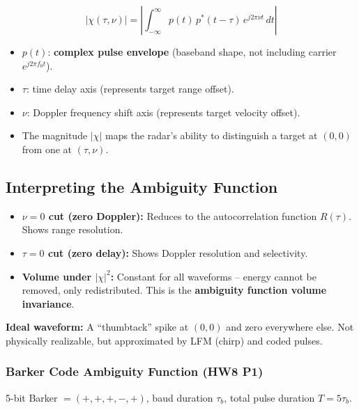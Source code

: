 \documentclass[10pt,letterpaper]{article}
\begin{document}
\begin{tcolorbox}[formulabox, title={Ambiguity Function Definition}]
\begin{equation}
  |\chi(\tau,\nu)| = \left|\int_{-\infty}^{\infty} p(t)\,p^*(t-\tau)\,e^{j2\pi\nu t}\,dt\right|
\end{equation}
\begin{itemize}[noitemsep]
  \item $p(t)$: \textbf{complex pulse envelope} (baseband shape, not including carrier $e^{j2\pi f_0 t}$).
  \item $\tau$: time delay axis (represents target range offset).
  \item $\nu$: Doppler frequency shift axis (represents target velocity offset).
  \item The magnitude $|\chi|$ maps the radar's ability to distinguish a target at $(0,0)$ from one at $(\tau,\nu)$.
\end{itemize}
\end{tcolorbox}

\subsection{Interpreting the Ambiguity Function}

\begin{tcolorbox}[keybox, title={Cuts of the Ambiguity Function}]
\begin{itemize}[noitemsep]
  \item \textbf{$\nu=0$ cut (zero Doppler):} Reduces to the autocorrelation function $R(\tau)$. Shows range resolution.
  \item \textbf{$\tau=0$ cut (zero delay):} Shows Doppler resolution and selectivity.
  \item \textbf{Volume under $|\chi|^2$:} Constant for all waveforms -- energy cannot be removed, only redistributed. This is the \textbf{ambiguity function volume invariance}.
\end{itemize}
\textbf{Ideal waveform:} A ``thumbtack'' spike at $(0,0)$ and zero everywhere else. Not physically realizable, but approximated by LFM (chirp) and coded pulses.
\end{tcolorbox}

\subsubsection{Barker Code Ambiguity Function (HW8 P1)}
5-bit Barker $= (+,+,+,-,+)$, baud duration $\tau_b$, total pulse duration $T = 5\tau_b$.
\end{document}
